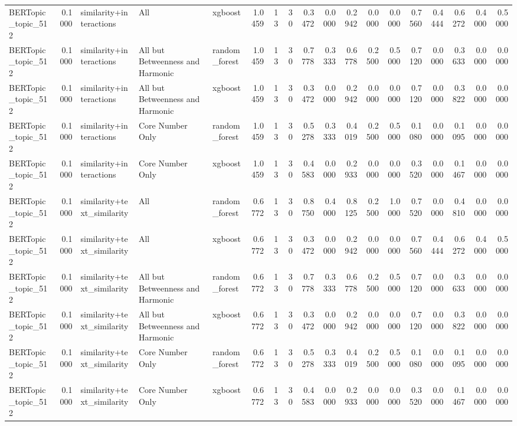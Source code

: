 \begin{tabular}{lrlllrrrrrrrrrrrrr}
BERTopic_topic_512 & 0.1000 & similarity+interactions & All & xgboost & 1.0459 & 13 & 30 & 0.3472 & 0.0000 & 0.2942 & 0.0000 & 0.0000 & 0.7560 & 0.4444 & 0.6272 & 0.4000 & 0.5000 \\
BERTopic_topic_512 & 0.1000 & similarity+interactions & All but Betweenness and Harmonic & random_forest & 1.0459 & 13 & 30 & 0.7778 & 0.3333 & 0.6778 & 0.2500 & 0.5000 & 0.7120 & 0.0000 & 0.3633 & 0.0000 & 0.0000 \\
BERTopic_topic_512 & 0.1000 & similarity+interactions & All but Betweenness and Harmonic & xgboost & 1.0459 & 13 & 30 & 0.3472 & 0.0000 & 0.2942 & 0.0000 & 0.0000 & 0.7120 & 0.0000 & 0.3822 & 0.0000 & 0.0000 \\
BERTopic_topic_512 & 0.1000 & similarity+interactions & Core Number Only & random_forest & 1.0459 & 13 & 30 & 0.5278 & 0.3333 & 0.4019 & 0.2500 & 0.5000 & 0.1080 & 0.0000 & 0.1095 & 0.0000 & 0.0000 \\
BERTopic_topic_512 & 0.1000 & similarity+interactions & Core Number Only & xgboost & 1.0459 & 13 & 30 & 0.4583 & 0.0000 & 0.2933 & 0.0000 & 0.0000 & 0.3520 & 0.0000 & 0.1467 & 0.0000 & 0.0000 \\
BERTopic_topic_512 & 0.1000 & similarity+text_similarity & All & random_forest & 0.6772 & 13 & 30 & 0.8750 & 0.4000 & 0.8125 & 0.2500 & 1.0000 & 0.7520 & 0.0000 & 0.4810 & 0.0000 & 0.0000 \\
BERTopic_topic_512 & 0.1000 & similarity+text_similarity & All & xgboost & 0.6772 & 13 & 30 & 0.3472 & 0.0000 & 0.2942 & 0.0000 & 0.0000 & 0.7560 & 0.4444 & 0.6272 & 0.4000 & 0.5000 \\
BERTopic_topic_512 & 0.1000 & similarity+text_similarity & All but Betweenness and Harmonic & random_forest & 0.6772 & 13 & 30 & 0.7778 & 0.3333 & 0.6778 & 0.2500 & 0.5000 & 0.7120 & 0.0000 & 0.3633 & 0.0000 & 0.0000 \\
BERTopic_topic_512 & 0.1000 & similarity+text_similarity & All but Betweenness and Harmonic & xgboost & 0.6772 & 13 & 30 & 0.3472 & 0.0000 & 0.2942 & 0.0000 & 0.0000 & 0.7120 & 0.0000 & 0.3822 & 0.0000 & 0.0000 \\
BERTopic_topic_512 & 0.1000 & similarity+text_similarity & Core Number Only & random_forest & 0.6772 & 13 & 30 & 0.5278 & 0.3333 & 0.4019 & 0.2500 & 0.5000 & 0.1080 & 0.0000 & 0.1095 & 0.0000 & 0.0000 \\
BERTopic_topic_512 & 0.1000 & similarity+text_similarity & Core Number Only & xgboost & 0.6772 & 13 & 30 & 0.4583 & 0.0000 & 0.2933 & 0.0000 & 0.0000 & 0.3520 & 0.0000 & 0.1467 & 0.0000 & 0.0000 \\

\end{tabular}
